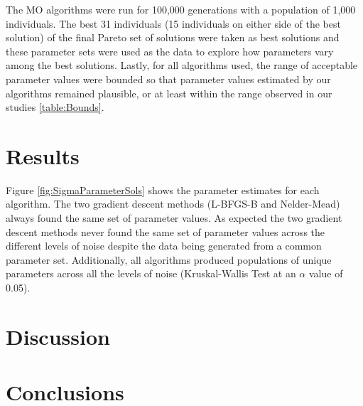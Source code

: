 \documentclass[twocolumn, 9pt]{article}
\begin{document}
The MO algorithms were run for 100,000 generations with a population of 1,000 individuals. The best 31 individuals (15 individuals on either side of the best solution) of the final Pareto set of solutions were taken as best solutions and these parameter sets were used as the data to explore how parameters vary among the best solutions. Lastly, for all algorithms used, the range of acceptable parameter values were bounded so that parameter values estimated by our algorithms remained plausible, or at least within the range observed in our studies \ref{table:Bounds}. 

\section{Results}

Figure \ref{fig:SigmaParameterSols} shows the parameter estimates for each algorithm. The two gradient descent methods (L-BFGS-B and Nelder-Mead) always found the same set of parameter values. As expected the two gradient descent methods never found the same set of parameter values across the different levels of noise despite the data being generated from a common parameter set. Additionally, all algorithms produced populations of unique parameters across all the levels of noise (Kruskal-Wallis Test at an $\alpha$ value of 0.05).

\section{Discussion}

\section{Conclusions}
\end{document}
